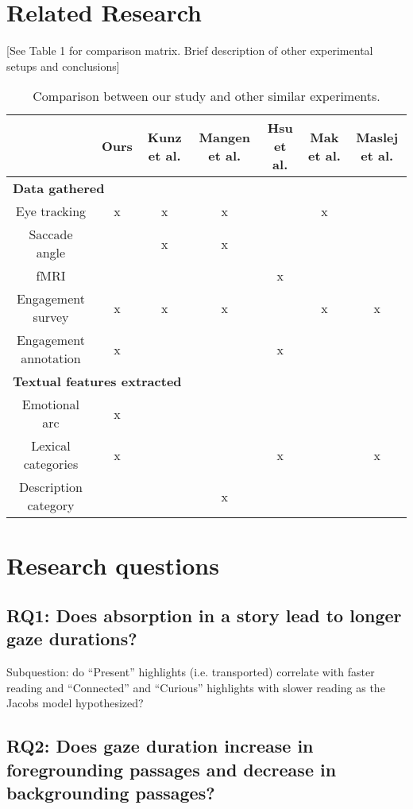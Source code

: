 \documentclass[11pt]{article}
\begin{document}
\section{Related Research}

[See Table 1 for comparison matrix. Brief description of other experimental setups and conclusions]

\begin{table*}[t]
\centering
\begin{tabular}{|c|c|c|c|c|c|c|}
\hline
& \textbf{Ours} & \textbf{Kunz et al.} & \textbf{Mangen et al.} & \textbf{Hsu et al.} & \textbf{Mak et al.} & \textbf{Maslej et al.} \\
\hline
\multicolumn{7}{|l|}{\textbf{Data gathered}}\\\hline
Eye tracking & x & x & x &  & x &  \\\hline
Saccade angle &  & x & x &  &  & \\\hline
fMRI &  &  &  & x &  & \\\hline
Engagement survey & x & x & x &  & x & x\\\hline
Engagement annotation & x &  &  & x &  & \\\hline
\multicolumn{7}{|l|}{\textbf{Textual features extracted}}\\\hline
Emotional arc & x &  &  &  &  & \\\hline
Lexical categories & x &  &  & x &  & x\\\hline
Description category &  &  & x &  &  & \\\hline

\end{tabular}
\caption{Comparison between our study and other similar experiments.}
\label{tab:accents}
\end{table*}

\section{Research questions}

\subsection{RQ1: Does absorption in a story lead to longer gaze durations?}

Subquestion: do “Present” highlights (i.e. transported) correlate with faster reading and “Connected” and “Curious” highlights with slower reading as the Jacobs model hypothesized?

\subsection{RQ2: Does gaze duration increase in foregrounding passages and decrease in backgrounding passages?}
\end{document}

